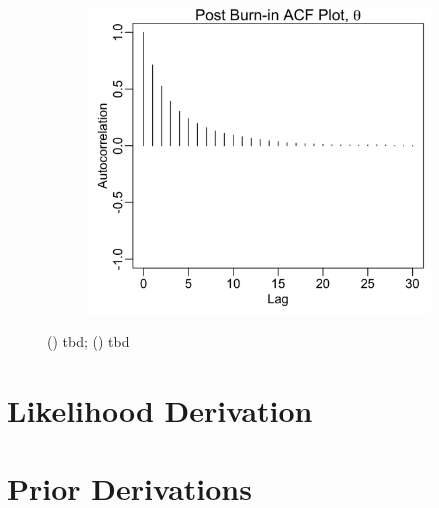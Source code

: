 \documentclass{uwstat572}
\begin{document}
\begin{figure}[H]
\begin{subfigure}[b]{0.49\textwidth}
		\includegraphics[width=\textwidth]{figures/mcmc_acf_plot_theta.png}
		\caption{}
		\label{fig:acf_theta}
	\end{subfigure}
	\caption{() tbd; () tbd }
	\label{fig:data_plot}
\end{figure} 

\newpage
\section{Likelihood Derivation}
\label{likelihood}



\newpage
\section{Prior Derivations}
\label{Priors}
\end{document}
